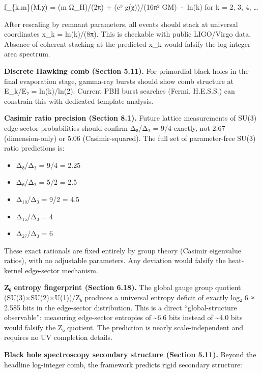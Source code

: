 \documentclass[11pt,a4paper]{article}
\theoremstyle{remark}
\providecommand{\tightlist}{%
  \setlength{\itemsep}{0pt}\setlength{\parskip}{0pt}}
\begin{document}
f\_\{k,m\}(M,χ) = (m Ω\_H)/(2π) + (c³ g(χ))/(16π² GM) · ln(k) for k = 2, 3, 4, \ldots{}

After rescaling by remnant parameters, all events should stack at universal coordinates x\_k = ln(k)/(8π). This is checkable with public LIGO/Virgo data. Absence of coherent stacking at the predicted x\_k would falsify the log-integer area spectrum.

\textbf{Discrete Hawking comb (Section 5.11).} For primordial black holes in the final evaporation stage, gamma-ray bursts should show comb structure at E\_k/E₂ = ln(k)/ln(2). Current PBH burst searches (Fermi, H.E.S.S.) can constrain this with dedicated template analysis.

\textbf{Casimir ratio precision (Section 8.1).} Future lattice measurements of SU(3) edge-sector probabilities should confirm Δ₈/Δ₃ = 9/4 exactly, not 2.67 (dimension-only) or 5.06 (Casimir-squared). The full set of parameter-free SU(3) ratio predictions is:

\begin{itemize}
\tightlist
\item
  Δ₈/Δ₃ = 9/4 = 2.25
\item
  Δ₆/Δ₃ = 5/2 = 2.5
\item
  Δ₁₀/Δ₃ = 9/2 = 4.5
\item
  Δ₁₅/Δ₃ = 4
\item
  Δ₂₇/Δ₃ = 6
\end{itemize}

These exact rationals are fixed entirely by group theory (Casimir eigenvalue ratios), with no adjustable parameters. Any deviation would falsify the heat-kernel edge-sector mechanism.

\textbf{Z₆ entropy fingerprint (Section 6.18).} The global gauge group quotient (SU(3)×SU(2)×U(1))/Z₆ produces a universal entropy deficit of exactly log₂ 6 ≈ 2.585 bits in the edge-sector distribution. This is a direct ``global-structure observable'': measuring edge-sector entropies of \textasciitilde6.6 bits instead of \textasciitilde4.0 bits would falsify the Z₆ quotient. The prediction is nearly scale-independent and requires no UV completion details.

\textbf{Black hole spectroscopy secondary structure (Section 5.11).} Beyond the headline log-integer comb, the framework predicts rigid secondary structure:
\end{document}
